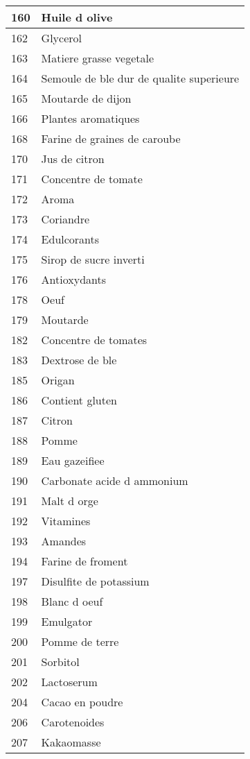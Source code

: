 \begin{longtable}{|l|l|}
160 & Huile d olive \\ \hline 
162 & Glycerol \\ \hline 
163 & Matiere grasse vegetale \\ \hline 
164 & Semoule de ble dur de qualite superieure \\ \hline 
165 & Moutarde de dijon \\ \hline 
166 & Plantes aromatiques \\ \hline 
168 & Farine de graines de caroube \\ \hline 
170 & Jus de citron \\ \hline 
171 & Concentre de tomate \\ \hline 
172 & Aroma \\ \hline 
173 & Coriandre \\ \hline 
174 & Edulcorants \\ \hline 
175 & Sirop de sucre inverti \\ \hline 
176 & Antioxydants \\ \hline 
178 & Oeuf \\ \hline 
179 & Moutarde \\ \hline 
182 & Concentre de tomates \\ \hline 
183 & Dextrose de ble \\ \hline 
185 & Origan \\ \hline 
186 & Contient gluten \\ \hline 
187 & Citron \\ \hline 
188 & Pomme \\ \hline 
189 & Eau gazeifiee \\ \hline 
190 & Carbonate acide d ammonium \\ \hline 
191 & Malt d orge \\ \hline 
192 & Vitamines \\ \hline 
193 & Amandes \\ \hline 
194 & Farine de froment \\ \hline 
197 & Disulfite de potassium \\ \hline 
198 & Blanc d oeuf \\ \hline 
199 & Emulgator \\ \hline 
200 & Pomme de terre \\ \hline 
201 & Sorbitol \\ \hline 
202 & Lactoserum \\ \hline 
204 & Cacao en poudre \\ \hline 
206 & Carotenoides \\ \hline 
207 & Kakaomasse \\ \hline 

\end{longtable}
